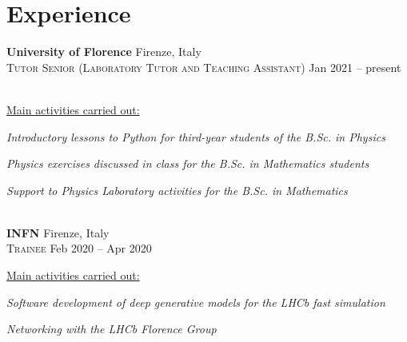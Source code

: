 \newcommand{\institution}[2]
  {\large \textbf{\color{hlcolor-0} #1} \hfill {\color{hlcolor-2} #2}}

\newcommand{\role}[2]
  {\small \color{hlcolor-1} 
  {\color{iconcolor} \faBriefcase}
  \textsc{#1} \hfill {#2}}


\section*{Experience}
\begin{cvcontent}
  \institution{University of Florence}{Firenze, Italy}\\ [0.5mm]
  \role{Tutor Senior (Laboratory Tutor and Teaching Assistant)}{Jan 2021 -- present}\\ [1.5mm]
  \\ [1.5mm]
  {\normalsize \color{maincolor} \ul{Main activities carried out:}\\ [1.5mm]
  \begin{itemize*}[label=\textcolor{iconcolor}{\textbullet}]
    \item \emph{Introductory lessons to Python for third-year 
      students of the B.Sc. in Physics}\\ [0.5mm]
    \item \emph{Physics exercises discussed in class for the 
      B.Sc. in Mathematics students}\\ [0.5mm]
    \item \emph{Support to Physics Laboratory activities for 
      the B.Sc. in Mathematics}
  \end{itemize*}}
  \\ [5mm]
  \institution{INFN}{Firenze, Italy}\\ [0.5mm]
  \role{Trainee}{Feb 2020 -- Apr 2020}\\ [1.5mm]
  {\normalsize \color{maincolor} \ul{Main activities carried out:}\\ [1.5mm]
  \begin{itemize*}[label=\textcolor{iconcolor}{\textbullet}]
    \item \emph{Software development of deep generative models 
      for the LHCb fast simulation}\\ [0.5mm]
    \item \emph{Networking with the LHCb Florence Group}
  \end{itemize*}}

\end{cvcontent}
